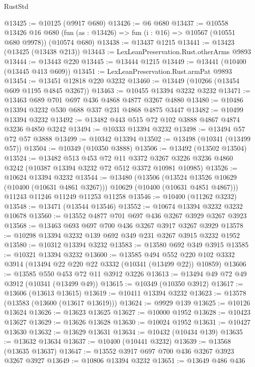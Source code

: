 \begin{lexlean}{RustStd}
\begin{coremodule}
{\begin{coremodule}
{{{{{{{{{{{{{{{{{{{{{{{{{@13425 := @10125 (@9917 @680)
@13426 := @6 @680
@13437 := @10558
    @13426
    @16
    @680
    (fun (as : @13426) => fun (i : @16) => @10567 (@10551 @680 @9978))
    (@10574 @680)
@13438 := @13437 @1215
@13441 := @13423 (@13425 (@13438 @213))
@13443 := LexLeanPreservation.Rust.otherArms @9893
@13444 := @13443 @220
@13445 := @13444 @1215
@13449 := @13441 (@10400 (@13445 @413 @609))
@13451 := LexLeanPreservation.Rust.armPat @9893
@13454 := @13451 @12818 @220 @3232
@13460 := @13449 (@10266 (@13454 @609 @1195 @4845 @3267))
@13463 := @10455 @13394 @3232 @3232
@13471 := @13463 @689 @701 @697 @436 @4868 @4877 @3267 @4880
@13480 := @10486 @13394 @3232 @530 @688 @337 @231 @4868 @4875 @3447
@13482 := @10499 @13394 @3232
@13492 := @13482 @443 @515 @72 @102 @3888 @4867 @4874 @3236 @4850 @3242
@13494 := @10333 @13394 @3232
@13498 := @13494 @57 @72 @57 @3888
@13499 := @10342 @13394
@13502 := @13498 (@10341 (@13499 @57))
@13504 := @10349 (@10350 @3888)
@13506 := @13492 (@13502 @13504)
@13524 := @13482
    @513
    @453
    @72
    @11
    @3372
    @3267
    @3226
    @3236
    @4860
    @3242
    (@10387 @13394 @3232 @72 @512 @3372 @10981 @10985)
@13526 := @10624 @13394 @3232
@13544 := @13480
    (@13506
      (@13524 @13526 @10629 (@10400 (@10631 @4861 @3267)))
      @10629
      (@10400 (@10631 @4851 @4867)))
    @11243
    @11246
    @11249
    @11253
    @11258
@13546 := @10400 (@11262 @3232)
@13548 := @13471 (@13544 @13546)
@13552 := @10674 @13394 @3232 @3232 @10678
@13560 := @13552 @4877 @701 @697 @436 @3267 @3929 @3267 @3923
@13568 := @13463 @693 @697 @700 @436 @3267 @3917 @3267 @3929
@13578 := @10298 @13394 @3232 @139 @692 @349 @231 @3267 @3915 @3232 @1952
@13580 := @10312 @13394 @3232
@13583 := @13580 @692 @349 @3915
@13585 := @10321 @13394 @3232
@13600 := @13585
    @494
    @552
    @220
    @102
    @3332
    @3914
    (@13494 @22 @220 @22 @3332 (@10341 (@13499 @22)) @10859)
@13606 := @13585 @550 @453 @72 @11 @3912 @3226
@13613 := @13494 @49 @72 @49 @3912 (@10341 (@13499 @49))
@13615 := @10349 (@10350 @3912)
@13617 := @13606 (@13613 @13615)
@13619 := @10411 @13394 @3232
@13623 := @13578 (@13583 (@13600 (@13617 @13619)))
@13624 := @9929 @139
@13625 := @10126 @13624
@13626 := @13623 @13625
@13627 := @10000 @1952
@13628 := @10423 @13627
@13629 := @13626 @13628
@13630 := @10024 @1952
@13631 := @10427 @13630
@13632 := @13629 @13631
@13634 := @10432 (@10434 @139)
@13635 := @13632 @13634
@13637 := @10400 (@10441 @3232)
@13639 := @13568 (@13635 @13637)
@13647 := @13552 @3917 @697 @700 @436 @3267 @3923 @3267 @3927
@13649 := @10806 @13394 @3232
@13651 := @13649 @486 @436
}}}}}}}}}}}}}}}}}}}}}}}}}
\end{coremodule}}
\end{coremodule}
\end{lexlean}
